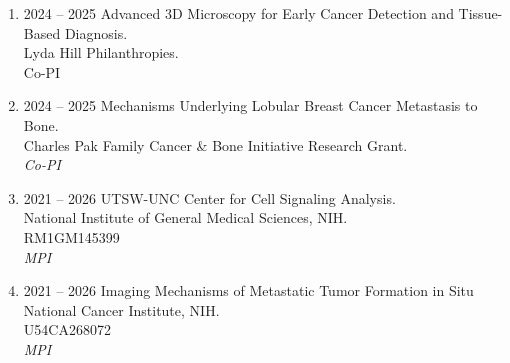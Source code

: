 \begin{enumerate}
[leftmargin=!,
labelindent=0pt,
itemindent=-66pt,
label=\textbullet]

\item 2024 -- 2025 
\hspace{8pt}
Advanced 3D Microscopy for Early Cancer Detection and Tissue-Based Diagnosis. \\
Lyda Hill Philanthropies. \\
Co-PI \\ 

\item 2024 -- 2025 
\hspace{8pt}
Mechanisms Underlying Lobular Breast Cancer Metastasis to Bone. \\
Charles Pak Family Cancer \& Bone Initiative Research Grant. \\
{\it Co-PI}

\item 2021 -- 2026 
\hspace{8pt}
UTSW-UNC Center for Cell Signaling Analysis. \\
National Institute of General Medical Sciences, NIH. \\
RM1GM145399 \\ 
{\it MPI}

\item 2021 -- 2026 
\hspace{8pt}
Imaging Mechanisms of Metastatic Tumor Formation in Situ \\
National Cancer Institute, NIH. \\
U54CA268072 \\ 
{\it MPI}

\end{enumerate}

